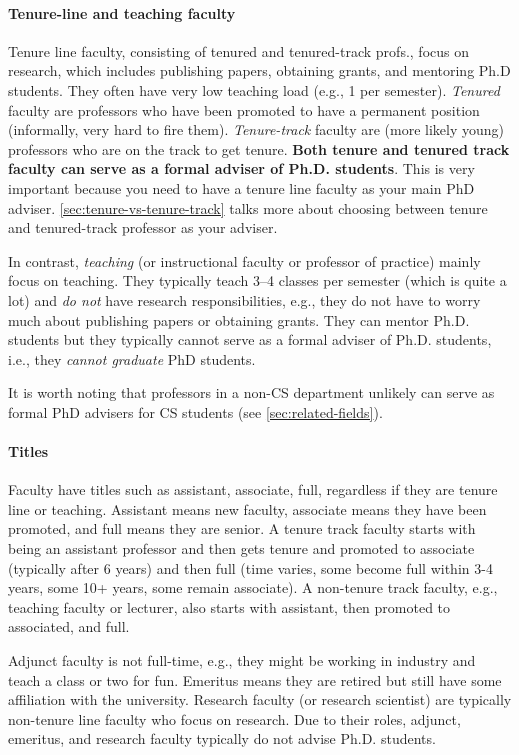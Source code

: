 \documentclass[oneside,11pt]{memoir}
\begin{document}
\paragraph{Tenure-line and teaching faculty} Tenure line faculty, consisting of tenured and tenured-track profs., focus on research, which includes publishing papers, obtaining grants, and mentoring Ph.D students.  They often have very low teaching load (e.g., 1 per semester). \emph{Tenured} faculty are professors who have been promoted to have a permanent position (informally, very hard to fire them).   \emph{Tenure-track} faculty are (more likely young) professors who are on the track to get tenure.  \textbf{Both tenure and tenured track faculty can serve as a formal adviser of Ph.D. students}. This is very important because you need to have a tenure line faculty as your main PhD adviser. \autoref{sec:tenure-vs-tenure-track} talks more about choosing between tenure and tenured-track professor as your adviser.

In contrast, \emph{teaching} (or instructional faculty or professor of practice) mainly focus on teaching. They typically teach 3--4 classes per semester (which is quite a lot) and \emph{do not} have research responsibilities, e.g., they do not have to worry much about publishing papers or obtaining grants. They can mentor Ph.D. students but they typically cannot serve as a formal adviser of Ph.D. students, i.e., they \emph{cannot graduate} PhD students.

It is worth noting that professors in a non-CS department unlikely can serve as formal PhD advisers for CS students (see \autoref{sec:related-fields}).

\paragraph{Titles} Faculty have titles such as assistant, associate, full, regardless if they are tenure line or teaching.  Assistant means new faculty, associate means they have been promoted, and full means they are senior. A tenure track faculty starts with being an assistant professor and then gets tenure and promoted to associate (typically after 6 years) and then full (time varies, some become full within 3-4 years, some 10+ years, some remain associate). A non-tenure track faculty, e.g., teaching faculty or lecturer, also starts with assistant, then promoted to associated, and full.

Adjunct faculty is not full-time, e.g., they might be working in industry and teach a class or two for fun.  Emeritus means they are retired but still have some affiliation with the university.  Research faculty (or research scientist) are typically non-tenure line faculty who focus on research.  Due to their roles, adjunct, emeritus, and research faculty typically do not advise Ph.D. students.
\end{document}
